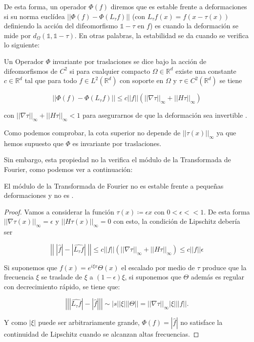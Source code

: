 \medskip 

\noindent De esta forma, un operador $\Phi(f)$ diremos que es estable frente a deformaciones si su norma euclídea $\left|\left| \Phi(f) - \Phi(L_\tau f) \right| \right|$ (con $L_{\tau} f(x)=f(x-\tau(x))$ definiendo la acción del difeomorfismo $\mathbb{1}-\tau$ en $f$) es  cuando la deformación se mide por $d_\Omega(\mathbb{1},\mathbb{1}-\tau)$. En otras palabras, la estabilidad se da cuando se verifica lo siguiente: 

\begin{definicion}
    Un Operador $\Phi$ invariante por traslaciones  se dice  bajo la acción de difeomorfismos de $C^2$ si para cualquier compacto $\Omega \in \mathbb{R}^d$ existe una constante $c\in \mathbb{R}^d$ tal que para todo $f\in L^2(\mathbb{R}^d)$ con soporte en $\Omega$ y $\tau \in C^2(\mathbb{R}^d)$ se tiene
    
    $$\left|\left| \Phi(f) - \Phi(L_\tau f) \right| \right| \leq c ||f|| (||\nabla \tau ||_{\infty} + ||H\tau||_\infty)$$
    
    con  $|| \nabla \tau ||_\infty + ||H \tau ||_\infty < 1$ para asegurarnos de que la deformación sea invertible \cite{doi:10.1137/S0036141002404838}.
\end{definicion}

\noindent Como podemos comprobar, la cota superior no depende de $||\tau(x)||_\infty$ ya que hemos supuesto que $\Phi$ es invariante por traslaciones. 

\noindent Sin embargo, esta propiedad no la verifica el módulo de la Transformada de Fourier, como podemos ver a continuación:

\begin{lema} \label{lemma:TF_inestable_difeomorfismos}
El módulo de la Transformada de Fourier no es estable frente a pequeñas deformaciones y no es .
\end{lema}

\begin{proof}
\noindent Vamos a considerar la función $\tau(x)\coloneqq \epsilon x$ con $0 < \epsilon << 1$. De esta forma $||\nabla \tau (x) ||_\infty = \epsilon$ y $||H\tau(x)||_\infty=0$ con esto, la condición de Lipschitz debería ser

$$\left|\left| \; |\widehat{f}| -|\widehat{L_\tau f}| \; \right|\right| \leq c ||f|| (||\nabla \tau ||_{\infty} + ||H\tau||_\infty) \leq c ||f|| \epsilon$$

\noindent Si suponemos que $f(x)=e^{i\xi x} \Theta(x)$ el escalado por medio de $\tau$ produce que la frecuencia $\xi$ se traslade de $\xi$ a $(1-\epsilon)\xi$, si suponemos que $\Theta$ además es regular con decrecimiento rápido, se tiene que:

$$\left|\left| |\widehat{L_\tau f}|-|\widehat{f}| \right|\right| \sim |s| |\xi| ||\Theta|| = ||\nabla \tau||_\infty |\xi| ||f||.$$

\noindent Y como $|\xi|$ puede ser arbitrariamente grande, $\Phi(f)=|\widehat{f}|$ no satisface la continuidad de Lipschitz cuando se alcanzan altas frecuencias.
\end{proof}
    
